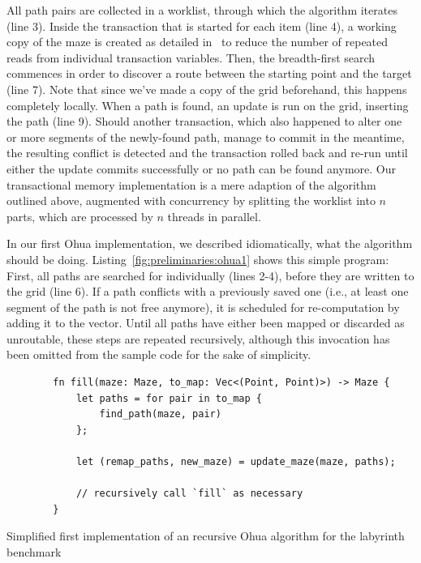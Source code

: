 All path pairs are collected in a worklist, through which the algorithm iterates (line 3).
Inside the transaction that is started for each item (line 4), a working copy of the maze is created as detailed in~\cite{swalens2016transactional} to reduce the number of repeated reads from individual transaction variables.
Then, the breadth-first search commences in order to discover a route between the starting point and the target (line 7).
Note that since we've made a copy of the grid beforehand, this happens completely locally.
When a path is found, an update is run on the grid, inserting the path (line 9).
Should another transaction, which also happened to alter one or more segments of the newly-found path, manage to commit in the meantime, the resulting conflict is detected and the transaction rolled back and re-run until either the update commits successfully or no path can be found anymore.
Our transactional memory implementation is a mere adaption of the algorithm outlined above, augmented with concurrency by splitting the worklist into $n$ parts, which are processed by $n$ threads in parallel.

In our first Ohua implementation, we described idiomatically, what the algorithm should be doing.
Listing~\ref{fig:preliminaries:ohua1} shows this simple program: First, all paths are searched for individually (lines 2-4), before they are written to the grid (line 6).
If a path conflicts with a previously saved one (i.e., at least one segment of the path is not free anymore), it is scheduled for re-computation by adding it to the  vector.
Until all paths have either been mapped or discarded as unroutable, these steps are repeated recursively, although this invocation has been omitted from the sample code for the sake of simplicity.

\begin{listing}[t]
    \begin{verbatim}
        fn fill(maze: Maze, to_map: Vec<(Point, Point)>) -> Maze {
            let paths = for pair in to_map {
                find_path(maze, pair)
            };

            let (remap_paths, new_maze) = update_maze(maze, paths);

            // recursively call `fill` as necessary
        }
    \end{verbatim}
    \caption{Simplified first implementation of an recursive Ohua algorithm for the labyrinth benchmark}%
    \label{fig:preliminaries:ohua1}
\end{listing}

